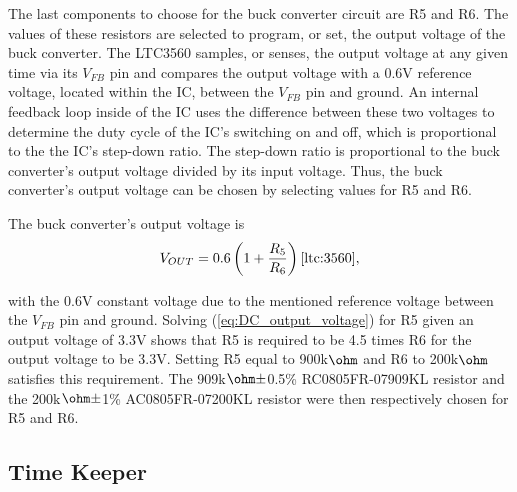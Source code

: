 
The last components to choose for the buck converter circuit are R5 and R6. The values of these resistors are selected to program, or set, the output voltage of the buck converter. The LTC3560 samples, or senses, the output voltage at any given time via its $V_{FB}$ pin and compares the output voltage with a 0.6V reference voltage, located within the IC, between the $V_{FB}$ pin and ground. An internal feedback loop inside of the IC uses the difference between these two voltages to determine the duty cycle of the IC's switching on and off, which is proportional to the the IC's step-down ratio. The step-down ratio is proportional to the buck converter's output voltage divided by its input voltage. Thus, the buck converter's output voltage can be chosen by selecting values for R5 and R6.


The buck converter's output voltage is
\begin{equation}
\label{eq:DC_output_voltage}
    V_{OUT} = 0.6\left(1+\frac{R_{5}}{R_{6}}\right) \cite{ltc:3560},
\end{equation}

with the 0.6V constant voltage due to the mentioned reference voltage between the $V_{FB}$ pin and ground. Solving (\ref{eq:DC_output_voltage}) for R5 given an output voltage of 3.3V shows that R5 is required to be 4.5 times R6 for the output voltage to be 3.3V. Setting R5 equal to 900k$\ohm$ and R6 to 200k$\ohm$ \DIFdelbegin {}\DIFdelend satisfies this requirement. The 909k$\ohm\pm$0.5\% RC0805FR-07909KL resistor and the 200k$\ohm\pm$1\% AC0805FR-07200KL resistor were then respectively chosen for R5 and R6.



\subsection{Time Keeper}
\label{ss:timekeeper}

